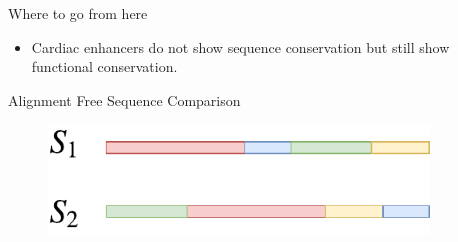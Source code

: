 \documentclass{beamer}
\begin{document}
    \begin{frame}{Where to go from here}
        \begin{itemize}
            \item Cardiac enhancers do not show sequence conservation but still show functional conservation.
        \end{itemize}
    \end{frame}
    
    \begin{frame}{Alignment Free Sequence Comparison}
        \begin{figure}
            \centering
            \includegraphics[width = 0.9\textwidth]{AlignmentFree.pdf}
            \label{fig:my_label}
        \end{figure}
    \end{frame}
    
\end{document}
